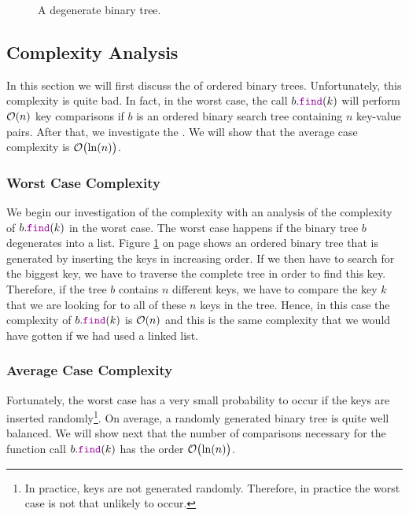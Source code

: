 \begin{figure}[!th]
  \centering 
  \caption{A degenerate binary tree.}
  \label{fig:degenerated}
\end{figure}


\subsection{Complexity Analysis}
In this section we will first discuss the  of ordered binary trees.  Unfortunately,
this complexity is quite bad.  In fact, in 
the worst case, the call $b.\mytt{find}(k)$ will perform $\mathcal{O}(n)$ key comparisons if $b$ is an ordered
binary search tree containing $n$ key-value pairs.  After that, we investigate the .  We
will show that the average case complexity is $\mathcal{O}\bigl(\ln(n)\bigr)$.

\subsubsection{Worst Case Complexity}
We begin our investigation of the complexity with an analysis of the complexity of $b.\mytt{find}(k)$ 
in the worst case.  The worst case happens if the binary tree $b$ degenerates into a list.
Figure \ref{fig:degenerated} on page \pageref{fig:degenerated} shows an ordered binary tree that
is generated by inserting the keys in increasing order.  If we then have to search for the
biggest key, we have to traverse the complete tree in order to find this key.  Therefore, if the
tree $b$ contains $n$ different keys, we have to compare the key $k$ that we are looking for to all
of these $n$ keys in the tree.  Hence, in this case the complexity of $b.\mytt{find}(k)$ is 
$\mathcal{O}(n)$ and this is the same complexity that we would have gotten if we had used a linked list.


\subsubsection{Average Case Complexity}
Fortunately, the worst case has a very small probability to occur if the keys are inserted randomly\footnote{
  In practice, keys are not generated randomly.  Therefore, in practice the worst case is not that unlikely to occur.
}. On average, a randomly generated
binary tree is quite well balanced.  We will show next that the number of comparisons necessary for
the function call $b.\mytt{find}(k)$ has the order $\mathcal{O}\bigl(\ln(n)\bigr)$.  


